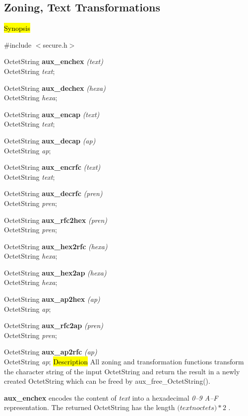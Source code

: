 \subsection{Zoning, Text Transformations}
\label{aux_encdec}
\hl{Synopsis}

\#include $<$secure.h$>$
 
OctetString  {\bf *aux\_enchex} {\em (text)} \\
OctetString {\em *text};

OctetString  {\bf *aux\_dechex} {\em (hexa)} \\
OctetString {\em *hexa};

OctetString  {\bf *aux\_encap} {\em (text)} \\
OctetString {\em *text};

OctetString  {\bf *aux\_decap} {\em (ap)} \\
OctetString {\em *ap};

OctetString  {\bf *aux\_encrfc} {\em (text)} \\
OctetString {\em *text};

OctetString  {\bf *aux\_decrfc} {\em (pren)} \\
OctetString {\em *pren};

OctetString  {\bf *aux\_rfc2hex} {\em (pren)} \\
OctetString {\em *pren};

OctetString  {\bf *aux\_hex2rfc} {\em (hexa)} \\
OctetString {\em *hexa};

OctetString  {\bf *aux\_hex2ap} {\em (hexa)} \\
OctetString {\em *hexa};

OctetString  {\bf *aux\_ap2hex} {\em (ap)} \\
OctetString {\em *ap};

OctetString  {\bf *aux\_rfc2ap} {\em (pren)} \\
OctetString {\em *pren};

OctetString  {\bf *aux\_ap2rfc} {\em (ap)} \\
OctetString {\em *ap};
\hl{Description}
All zoning and transformation functions transform the character string
of the input OctetString
and return the result in a newly created OctetString which
can be freed by aux\_free\_OctetString().

{\bf aux\_enchex} encodes the content of {\em text}
into a hexadecimal {\em 0--9 A--F} representation.
The returned OctetString has the length
$(text$\pf $noctets)*2$ .

